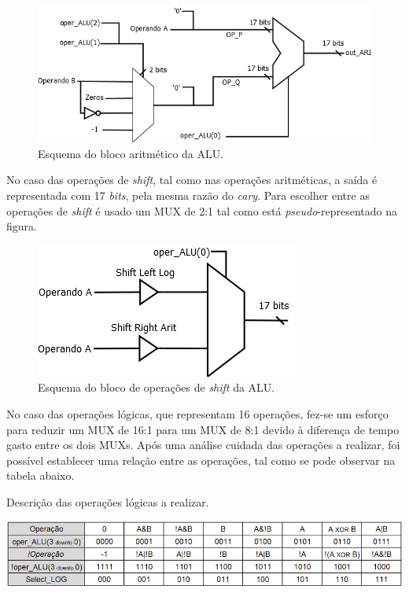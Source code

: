 \documentclass[11pt]{article}
\numberwithin{equation}{section}
\begin{document}
\vspace{1mm}

\begin{figure}[H]
	\centering
	\includegraphics[keepaspectratio=true, scale=0.40]{imagens/Arit}
	\caption{Esquema do bloco aritmético da ALU.}
	\vspace{-0.8em}
\end{figure}

No caso das operações de \textit{shift}, tal como nas operações aritméticas, a saída é representada com 17 \textit{bits}, pela mesma razão do \textit{cary}. Para escolher entre as operações de \textit{shift} é usado um MUX de 2:1 tal como está \textit{pseudo}-representado na figura.

\begin{figure}[H]
	\centering
	\includegraphics[keepaspectratio=true, scale=0.40]{imagens/Shift}
	\caption{Esquema do bloco de operações de \textit{shift} da ALU.}
	\vspace{-0.8em}
\end{figure}

No caso das operações lógicas, que representam 16 operações, fez-se um esforço para reduzir um MUX de 16:1 para um MUX de 8:1 devido à diferença de tempo gasto entre os dois MUXs. Após uma análise cuidada das operações a realizar, foi possível establecer uma relação entre as operações, tal como se pode observar na tabela abaixo.

\begin{table}[h]
	\centering
	\caption{Descrição das operações lógicas a realizar.}
	\vspace{-2mm}
 	\includegraphics[keepaspectratio=true, scale=0.35]{tabelas/MUX8-1}
\end{table}
\end{document}
